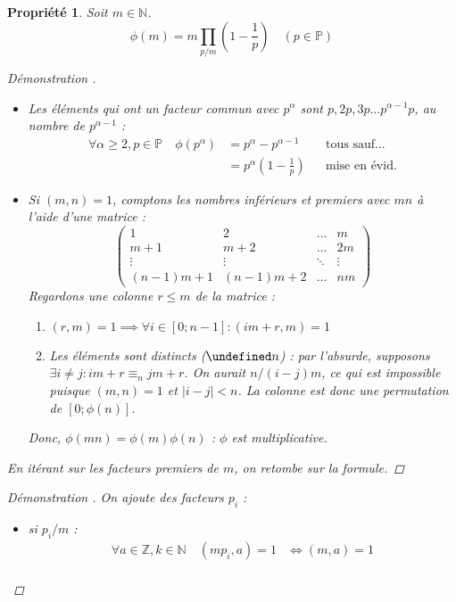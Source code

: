 \documentclass[11pt,twocolumn]{article}
\let\mod\undefined
\DeclareMathOperator{\mod}{mod}
\theoremstyle{plain}
\newtheorem{pr}{Propriété}
\newcommand{\esP}{\mathbb{P}} %
\newcommand{\esN}{\mathbb{N}} %
\newcommand{\esZ}{\mathbb{Z}} %
\newcommand{\dbi}{\Longleftrightarrow}
\newenvironment{cproof}[1]{\begin{proof}[Démonstration \cite{#1}]}{\end{proof}}
\begin{document}
\begin{pr}
	Soit $m \in \esN$. \[
		\phi(m) = m \left.\prod_{p/m} \left(1 - \frac1p\right)\right.
		\quad (p \in \esP)
	\]
	\begin{cproof}{Buys} ~
		\begin{itemize}
			\item Les éléments qui ont un facteur commun avec $p^\alpha$ sont
				$p, 2p, 3p \dots p^{\alpha-1}p$, au nombre de $p^{\alpha-1}$ :
				\begin{align*}
					\forall \alpha \geq 2, p \in \esP \quad
					\phi\left(p^\alpha\right) &= p^\alpha - p^{\alpha-1}
						&& \text{tous sauf...} \\
					&= p^\alpha\left(1-\frac1p\right)
						&& \text{mise en évid.}
				\end{align*}
			\item Si $(m,n)=1$, comptons les nombres
				inférieurs et premiers avec $mn$ à l'aide d'une matrice : \[
					\left(\begin{array}{llll}
						1 & 2 & \dots & m \\
						m+1 & m+2 & \dots & 2m \\
						\vdots & \vdots & \ddots & \vdots \\
						(n-1)m+1 & (n-1)m+2 & \dots & nm
					\end{array}\right)
				\]
				Regardons une colonne $r \leq m$ de la matrice :
				\begin{enumerate}
					\item $(r,m)=1 \implies \forall i \in [0;n-1] : (im+r,m)=1$
					\item Les éléments sont distincts ($\mod n$) :
						par l'absurde,
						supposons $\exists i \neq j : im+r \equiv_n jm+r$.
						On aurait $n/\left(i-j\right)m$, ce qui est impossible
						puisque $(m,n)=1$ et $\left|i-j\right|<n$.
						La colonne est donc une permutation de $[0;\phi(n)]$.
				\end{enumerate}
				Donc, $\phi(mn)=\phi(m)\phi(n)$ : $\phi$ est multiplicative.
		\end{itemize}
		En itérant sur les facteurs premiers de $m$, on retombe sur la formule.
	\end{cproof}
	\begin{cproof}{Buys}
		On ajoute des facteurs $p_i$ :
		\begin{itemize}
			\item si $p_i/m$ :
				\begin{align*}
					\forall a \in \esZ, k \in \esN \quad (mp_i,a)=1
					&\dbi (m,a)=1 \\

\end{align*}
\end{itemize}
\end{cproof}
\end{pr}
\end{document}

